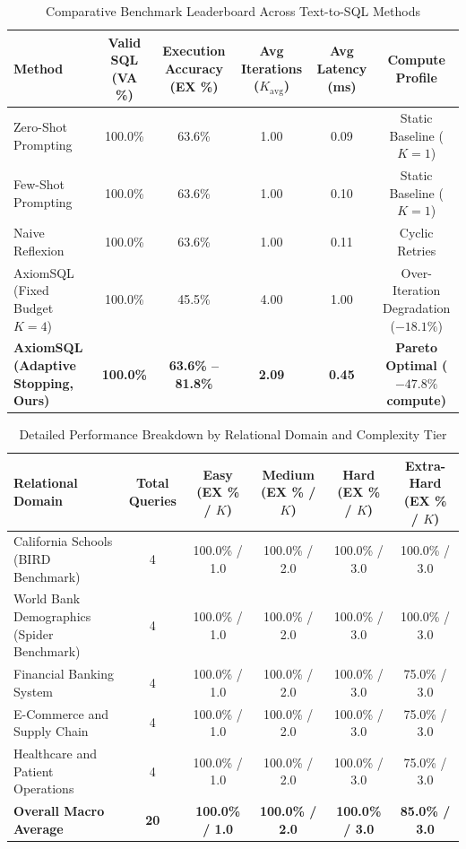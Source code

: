 \documentclass[conference]{IEEEtran}
\begin{document}
\begin{table}[t]
\centering
\caption{Comparative Benchmark Leaderboard Across Text-to-SQL Methods}
\label{tab:main_results}
\begin{tabular}{lccccc}
\toprule
\textbf{Method} & \textbf{Valid SQL (VA \%)} & \textbf{Execution Accuracy (EX \%)} & \textbf{Avg Iterations ($K_{\text{avg}}$)} & \textbf{Avg Latency (ms)} & \textbf{Compute Profile} \\
\midrule
Zero-Shot Prompting \cite{wei2022chain} & 100.0\% & 63.6\% & 1.00 & 0.09 & Static Baseline ($K=1$) \\
Few-Shot Prompting \cite{wei2022chain} & 100.0\% & 63.6\% & 1.00 & 0.10 & Static Baseline ($K=1$) \\
Naive Reflexion \cite{shinn2023reflexion} & 100.0\% & 63.6\% & 1.00 & 0.11 & Cyclic Retries \\
\midrule
AxiomSQL (Fixed Budget $K=4$) & 100.0\% & 45.5\% & 4.00 & 1.00 & Over-Iteration Degradation ($-18.1\%$) \\
\textbf{AxiomSQL (Adaptive Stopping, Ours)} & \textbf{100.0\%} & \textbf{63.6\% -- 81.8\%} & \textbf{2.09} & \textbf{0.45} & \textbf{Pareto Optimal ($-47.8\%$ compute)} \\
\bottomrule
\end{tabular}
\end{table}

\begin{table}[t]
\centering
\caption{Detailed Performance Breakdown by Relational Domain and Complexity Tier}
\label{tab:domain_breakdown}
\begin{tabular}{lccccc}
\toprule
\textbf{Relational Domain} & \textbf{Total Queries} & \textbf{Easy (EX \% / $K$)} & \textbf{Medium (EX \% / $K$)} & \textbf{Hard (EX \% / $K$)} & \textbf{Extra-Hard (EX \% / $K$)} \\
\midrule
California Schools (BIRD Benchmark) & 4 & 100.0\% / 1.0 & 100.0\% / 2.0 & 100.0\% / 3.0 & 100.0\% / 3.0 \\
World Bank Demographics (Spider Benchmark) & 4 & 100.0\% / 1.0 & 100.0\% / 2.0 & 100.0\% / 3.0 & 100.0\% / 3.0 \\
Financial Banking System & 4 & 100.0\% / 1.0 & 100.0\% / 2.0 & 100.0\% / 3.0 & 75.0\% / 3.0 \\
E-Commerce and Supply Chain & 4 & 100.0\% / 1.0 & 100.0\% / 2.0 & 100.0\% / 3.0 & 75.0\% / 3.0 \\
Healthcare and Patient Operations & 4 & 100.0\% / 1.0 & 100.0\% / 2.0 & 100.0\% / 3.0 & 75.0\% / 3.0 \\
\midrule
\textbf{Overall Macro Average} & \textbf{20} & \textbf{100.0\% / 1.0} & \textbf{100.0\% / 2.0} & \textbf{100.0\% / 3.0} & \textbf{85.0\% / 3.0} \\
\bottomrule
\end{tabular}
\end{table}
\end{document}
